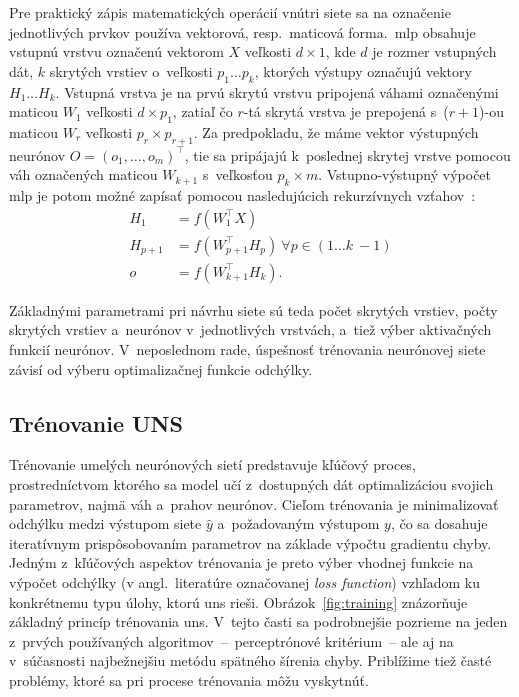   Pre praktický zápis matematických operácií vnútri siete sa na označenie jednotlivých prvkov používa vektorová, resp.\ maticová forma.\ \acrshort{mlp} obsahuje vstupnú vrstvu označenú vektorom $X$ veľkosti $d \times 1$, kde $d$ je rozmer vstupných dát, $k$ skrytých vrstiev o~veľkosti $p_1 \dots p_k$, ktorých výstupy označujú vektory $H_1 \dots H_k$. Vstupná vrstva je na prvú skrytú vrstvu pripojená váhami označenými maticou $W_1$ veľkosti $d \times p_1$, zatiaľ čo $r$-tá skrytá vrstva je prepojená s~($r+1$)-ou maticou $W_r$ veľkosti $p_r \times p_{r+1}$. Za predpokladu, že máme vektor výstupných neurónov $O = {(o_1,\dots,o_m)}^{\top}$, tie sa pripájajú k~poslednej skrytej vrstve pomocou váh označených maticou $W_{k+1}$ s~veľkosťou $p_k \times m$. Vstupno-výstupný výpočet \acrshort{mlp} je potom možné zapísať pomocou nasledujúcich rekurzívnych vzťahov~\cite{aggarwalNeuralNetworksDeep2018}:
  \begin{subequations}
    \begin{align}
      H_1 &= f \left( W_1^{\top} X \right) \\
      H_{p+1} &= f \left( W_{p + 1}^{\top} H_p \right)\ \forall p \in (1 \dots k~- 1) \\
      o~&= f \left( W_{k+1}^{\top} H_k \right).
    \end{align}
  \end{subequations}
  
  Základnými parametrami pri návrhu siete sú teda počet skrytých vrstiev, počty skrytých vrstiev a~neurónov v~jednotlivých vrstvách, a~tiež výber aktivačných funkcií neurónov. V~neposlednom rade, úspešnosť trénovania neurónovej siete závisí od výberu optimalizačnej funkcie odchýlky.
  
\subsection{Trénovanie UNS}\label{ssec:training}

  Trénovanie umelých neurónových sietí predstavuje kľúčový proces, prostredníctvom ktorého sa model učí z~dostupných dát optimalizáciou svojich parametrov, najmä váh a~prahov neurónov. Cieľom trénovania je minimalizovať odchýlku medzi výstupom siete $\hat y$ a~požadovaným výstupom $y$, čo sa dosahuje iteratívnym prispôsobovaním parametrov na základe výpočtu gradientu chyby. Jedným z~kľúčových aspektov trénovania je preto výber vhodnej funkcie na výpočet odchýlky (v angl.\ literatúre označovanej \emph{loss function}) vzhľadom ku konkrétnemu typu úlohy, ktorú \acrshort{uns} rieši. Obrázok~\ref{fig:training} znázorňuje základný princíp trénovania \acrshort{uns}. V~tejto časti sa podrobnejšie pozrieme na jeden z~prvých používaných algoritmov~--~perceptrónové kritérium~-- ale aj na v~súčasnosti najbežnejšiu metódu spätného šírenia chyby. Priblížime tiež časté problémy, ktoré sa pri procese trénovania môžu vyskytnúť.

